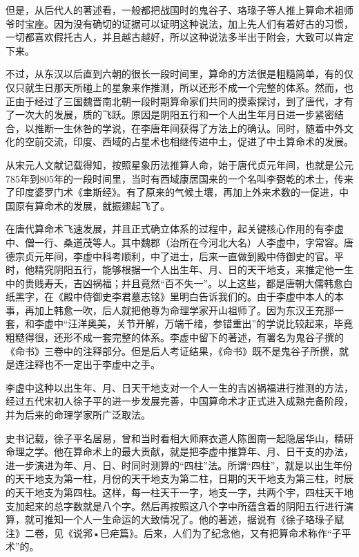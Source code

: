 \documentclass[a5paper,oneside,12pt]{ctexbook}
\begin{document}
但是，从后代人的著述看，一般都把战国时的鬼谷子、珞琭子等人推上算命术祖师爷时宝座。因为没有确切的证据可以证明这种说法，加上先人们有着好古的习惯，一切都喜欢假托古人，并且越古越好，所以这种说法多半出于附会，大致可以肯定下来。

不过，从东汉以后直到六朝的很长一段时间里，算命的方法很是粗糙简单，有的仅仅只就生日那天所碰上的星象来作推测，所以还形不成一个完整的体系。然而，也正由于经过了三国魏晋南北朝一段时期算命家们共同的摸索探讨，到了唐代，才有了一次大的发展，质的飞跃。原因是阴阳五行和一个人出生年月日进一步紧密结合，以推断一生休咎的学说，在李唐年间获得了方法上的确认。同时，随着中外文化的空前交流，印度、西域的占星术也相继传进中土，促进了中土算命术的发展。

从宋元人文献记载得知，按照星象历法推算人命，始于唐代贞元年间，也就是公元785年到805年的一段时间里，当时有西域康居国来的一个名叫李弼乾的术士，传来了印度婆罗门术《聿斯经》。有了原来的气候土壤，再加上外来术数的一促进，中国原有算命术的发展，就振翅起飞了。

在唐代算命术飞速发展，并且正式确立体系的过程中，起关键核心作用的有李虚中、僧一行、桑道茂等人。其中魏郡（治所在今河北大名）人李虚中，字常容。唐德宗贞元年间，李虚中科考顺利，中了进士，后来一直做到殿中侍御史的官。平时，他精究阴阳五行，能够根据一个人出生年、月、日的天干地支，来推定他一生中的贵贱寿夭，吉凶祸福；并且竟然“百不失一”。以上这些，都是唐朝大儒韩愈白纸黑字，在《殿中侍御史李君墓志铭》里明白告诉我们的。由于李虚中本人的本事，再加上韩愈一吹，后人就把他尊为命理学家开山祖师了。因为东汉王充那一套，和李虚中“汪洋奥美，关节开解，万端千绪，参错重出”的学说比较起来，毕竟粗糙得很，还形不成一套完整的体系。李虚中留下的著述，有署名为鬼谷子撰的《命书》三卷中的注释部分。但是后人考证结果，《命书》既不是鬼谷子所撰，就是连注释也不一定出于李虚中之手。

李虚中这种以出生年、月、日天干地支对一个人一生的吉凶祸福进行推测的方法，经过五代宋初人徐子平的进一步发展完善，中国算命术才正式进入成熟完备阶段，并为后来的命理学家所广泛取法。

史书记载，徐子平名居易，曾和当时看相大师麻衣道人陈图南一起隐居华山，精研命理之学。他在算命术上的最大贡献，就是把李虚中推算年、月、日干支的办法，进一步演进为年、月、日、时同时测算的“四柱”法。所谓“四柱”，就是以出生年份的天干地支为第一柱，月份的天干地支为第二柱，日期的天干地支为第三柱，时辰的天干地支为第四柱。这样，每一柱天干一字，地支一字，共两个宇，四柱天干地支加起来的总字数就是八个字。然后再按照这八个字中所蕴含着的阴阳五行进行演算，就可推知一个人一生命运的大致情况了。他的著述，据说有《徐子珞琭子赋注》二卷，见《说郛•巳疟篇》。后来，人们为了纪念他，又有把算命术称作“子平术”的。
\end{document}
